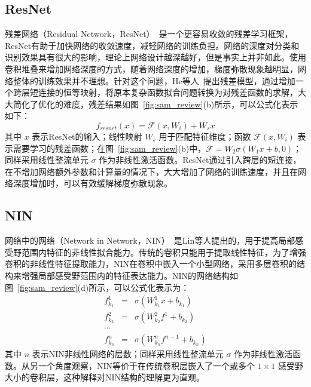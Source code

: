 \subsection{ResNet}
\label{sec:sap:review:resnet}

残差网络（Residual Network，ResNet）~\cite{he2015deep}是一个更容易收敛的残差学习框架，ResNet有助于加快网络的收敛速度，减轻网络的训练负担。网络的深度对分类和识别效果具有很大的影响，理论上网络设计越深越好，但是事实上并非如此。使用卷积堆叠来增加网络深度的方式，随着网络深度的增加，梯度弥散现象越明显，网络整体的训练效果并不理想。针对这个问题，He等人~\cite{he2015deep}提出残差模型，通过增加一个跨层短连接的恒等映射，将原本复杂函数拟合问题转换为对残差函数的求解，大大简化了优化的难度，残差结果如图~\ref{fig:sam_review}(b)所示，可以公式化表示如下：
\begin{equation} \label{equ:resnet}
f_{resnet}(x)=\mathcal{F}(x, W_i) + W_{s}x
\end{equation}
其中 $x$ 表示ResNet的输入；线性映射 $W_s$ 用于匹配特征维度；函数 $\mathcal{F}(x, W_i)$ 表示需要学习的残差函数；在图~\ref{fig:sam_review}(b)中，$\mathcal{F} = W_{2}\sigma(W_{1}x+b, 0)$；同样采用线性整流单元 $\sigma$ 作为非线性激活函数。ResNet通过引入跨层的短连接，在不增加网络额外参数和计算量的情况下，大大增加了网络的训练速度，并且在网络深度增加时，可以有效缓解梯度弥散现象。


\subsection{NIN}
\label{sec:sap:review:nin}

网络中的网络（Network in Network，NIN）~\cite{DBLP:journals/corr/LinCY13}是Lin等人提出的，用于提高局部感受野范围内特征的非线性拟合能力。传统的卷积只能用于提取线性特征，为了增强卷积的非线性特征提取能力，NIN在卷积中嵌入一个小型网络，采用多层卷积的结构来增强局部感受野范围内的特征表达能力。NIN的网络结构如图~\ref{fig:sam_review}(d)所示，可以公式化表示为：
\begin{eqnarray} \label{equ:nin}
f_{k_1}^{1}&=&\sigma(W_{k_1}^{1}x+b_{k_1}) \nonumber\\
f_{k_2}^{2}&=&\sigma(W_{k_2}^{2}f^{1}+b_{k_2}) \nonumber\\
\cdots&\nonumber\\
f_{k_n}^{n}&=&\sigma(W_{k_n}^{n}f^{n-1}+b_{k_n})
\end{eqnarray}
其中 $n$ 表示NIN非线性网络的层数；同样采用线性整流单元 $\sigma$ 作为非线性激活函数。从另一个角度观察，NIN等价于在传统卷积层嵌入了一个或多个 $1\times1$ 感受野大小的卷积层，这种解释对NIN结构的理解更为直观。

